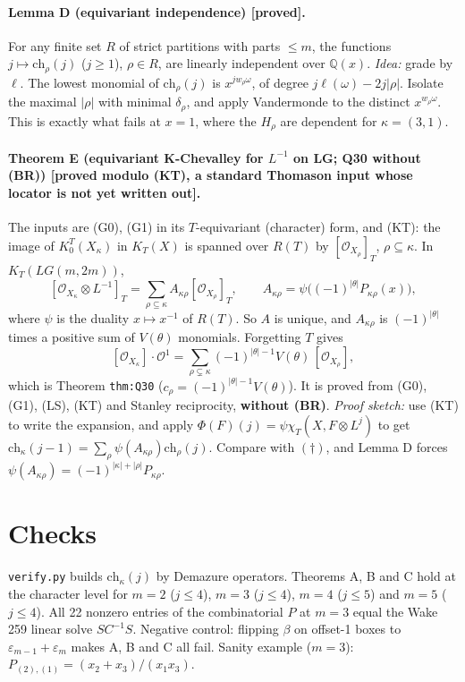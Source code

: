 \documentclass[11pt]{article}
\begin{document}
\paragraph{Lemma D (equivariant independence) [proved].} For any finite set $R$ of strict partitions with parts $\le m$, the functions $j\mapsto\mathrm{ch}_\rho(j)$ ($j\ge1$), $\rho\in R$, are linearly independent over $\mathbb{Q}(x)$.
\emph{Idea:} grade by $\ell$. The lowest monomial of $\mathrm{ch}_\rho(j)$ is $x^{jw_\rho\omega}$, of degree $j\ell(\omega)-2j|\rho|$. Isolate the maximal $|\rho|$ with minimal $\delta_\rho$, and apply Vandermonde to the distinct $x^{w_\rho\omega}$. This is exactly what fails at $x=1$, where the $H_\rho$ are dependent for $\kappa=(3,1)$.

\paragraph{Theorem E (equivariant K-Chevalley for $L^{-1}$ on LG; Q30 without (BR)) [proved modulo (KT), a standard Thomason input whose locator is not yet written out].}
The inputs are (G0), (G1) in its $T$-equivariant (character) form, and (KT): the image of $K_0^T(X_\kappa)$ in $K_T(X)$ is spanned over $R(T)$ by $[\mathcal{O}_{X_\rho}]_T$, $\rho\subseteq\kappa$. In $K_T(LG(m,2m))$,
\[
[\mathcal{O}_{X_\kappa}\otimes L^{-1}]_T=\sum_{\rho\subseteq\kappa}A_{\kappa\rho}[\mathcal{O}_{X_\rho}]_T,\qquad A_{\kappa\rho}=\psi\big((-1)^{|\theta|}P_{\kappa\rho}(x)\big),
\]
where $\psi$ is the duality $x\mapsto x^{-1}$ of $R(T)$. So $A$ is unique, and $A_{\kappa\rho}$ is $(-1)^{|\theta|}$ times a positive sum of $V(\theta)$ monomials. Forgetting $T$ gives
\[
[\mathcal{O}_{X_\kappa}]\cdot\mathcal{O}^1=\sum_{\rho\subsetneq\kappa}(-1)^{|\theta|-1}V(\theta)\,[\mathcal{O}_{X_\rho}],
\]
which is Theorem \texttt{thm:Q30} ($c_\rho=(-1)^{|\theta|-1}V(\theta)$). It is proved from (G0), (G1), (LS), (KT) and Stanley reciprocity, \textbf{without (BR)}.
\emph{Proof sketch:} use (KT) to write the expansion, and apply $\Phi(F)(j)=\psi\chi_T(X,F\otimes L^j)$ to get $\mathrm{ch}_\kappa(j-1)=\sum_\rho\psi(A_{\kappa\rho})\mathrm{ch}_\rho(j)$. Compare with $(\dagger)$, and Lemma D forces $\psi(A_{\kappa\rho})=(-1)^{|\kappa|+|\rho|}P_{\kappa\rho}$.

\section*{Checks}
\texttt{verify.py} builds $\mathrm{ch}_\kappa(j)$ by Demazure operators. Theorems A, B and C hold at the character level for $m=2$ ($j\le4$), $m=3$ ($j\le4$), $m=4$ ($j\le5$) and $m=5$ ($j\le4$). All 22 nonzero entries of the combinatorial $P$ at $m=3$ equal the Wake 259 linear solve $SC^{-1}S$. Negative control: flipping $\beta$ on offset-1 boxes to $\varepsilon_{m-1}+\varepsilon_m$ makes A, B and C all fail.
Sanity example ($m=3$): $P_{(2),(1)}=(x_2+x_3)/(x_1x_3)$.
\end{document}
